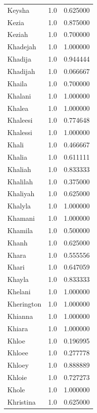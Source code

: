 \documentclass[
  letterpaper,
  DIV=11,
  numbers=noendperiod]{scrreprt}
\begin{document}
\begin{tabular}{lrr}
Keysha          &   1.0 &   0.625000 \\
Kezia           &   1.0 &   0.875000 \\
Keziah          &   1.0 &   0.700000 \\
Khadejah        &   1.0 &   1.000000 \\
Khadija         &   1.0 &   0.944444 \\
Khadijah        &   1.0 &   0.066667 \\
Khaila          &   1.0 &   0.700000 \\
Khalani         &   1.0 &   1.000000 \\
Khalea          &   1.0 &   1.000000 \\
Khaleesi        &   1.0 &   0.774648 \\
Khalessi        &   1.0 &   1.000000 \\
Khali           &   1.0 &   0.466667 \\
Khalia          &   1.0 &   0.611111 \\
Khaliah         &   1.0 &   0.833333 \\
Khalilah        &   1.0 &   0.375000 \\
Khaliyah        &   1.0 &   0.625000 \\
Khalyla         &   1.0 &   1.000000 \\
Khamani         &   1.0 &   1.000000 \\
Khamila         &   1.0 &   0.500000 \\
Khanh           &   1.0 &   0.625000 \\
Khara           &   1.0 &   0.555556 \\
Khari           &   1.0 &   0.647059 \\
Khayla          &   1.0 &   0.833333 \\
Khelani         &   1.0 &   1.000000 \\
Kherington      &   1.0 &   1.000000 \\
Khianna         &   1.0 &   1.000000 \\
Khiara          &   1.0 &   1.000000 \\
Khloe           &   1.0 &   0.196995 \\
Khloee          &   1.0 &   0.277778 \\
Khloey          &   1.0 &   0.888889 \\
Khloie          &   1.0 &   0.727273 \\
Khole           &   1.0 &   1.000000 \\
Khristina       &   1.0 &   0.625000 \\

\end{tabular}
\end{document}
